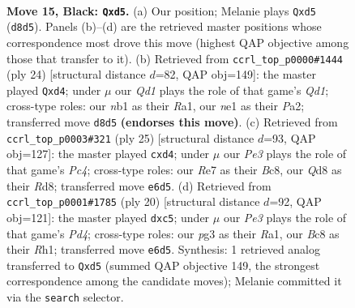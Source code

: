\documentclass[11pt]{article}
\begin{document}
\clearpage

\begin{figure}[p]\centering
\begin{subfigure}{0.46\textwidth}\centering
\resizebox{\linewidth}{!}{%
\newchessgame
\chessboard[
  setfen={r1bq2k1/p3rppp/4pn2/2pP4/n7/3BP1P1/PP3RPP/RNQ1N1K1 b - - 0 15},
  showmover=false,
  pgfstyle=straightmove, color=movearrow, markmove={d8-d5}
]}
\caption{}
\end{subfigure}\hfill
\begin{subfigure}{0.46\textwidth}\centering
\resizebox{\linewidth}{!}{%
\newchessgame
\chessboard[
  setfen={rn2k2r/4bppp/pq2p3/1p1b4/3p4/1P2PNP1/P4PBP/R1BQR1K1 w kq - 0 13},
  showmover=false,
  pgfstyle=straightmove, color=movearrow, markmove={d1-d4}
]}
\caption{}
\end{subfigure}
\\[4pt]
\begin{subfigure}{0.46\textwidth}\centering
\resizebox{\linewidth}{!}{%
\newchessgame
\chessboard[
  setfen={r1br2k1/pp3ppp/2n1p2q/2p5/3PQ3/3B1N2/PPP2PPP/1K1R3R b - - 7 13},
  showmover=false,
  pgfstyle=straightmove, color=movearrow, markmove={c5-d4}
]}
\caption{}
\end{subfigure}\hfill
\begin{subfigure}{0.46\textwidth}\centering
\resizebox{\linewidth}{!}{%
\newchessgame
\chessboard[
  setfen={r1b2rk1/pp1nqppp/8/2pp4/3P4/4PN2/PPQ2PPP/R3KB1R w KQ - 0 11},
  showmover=false,
  pgfstyle=straightmove, color=movearrow, markmove={d4-c5}
]}
\caption{}
\end{subfigure}
\caption{\textbf{Move 15, Black: \texttt{Qxd5}.} (a) Our position; Melanie plays \texttt{Qxd5} (\texttt{d8d5}). Panels (b)--(d) are the retrieved master positions whose correspondence most drove this move (highest QAP objective among those that transfer to it). (b) Retrieved from \texttt{ccrl\_top\_p0000\#1444} (ply 24) [structural distance $d$=82, QAP obj=149]: the master played \texttt{Qxd4}; under $\mu$ our \emph{Qd1} plays the role of that game's \emph{Qd1}; cross-type roles: our \emph{n}b1 as their \emph{R}a1, our \emph{n}e1 as their \emph{P}a2; transferred move \texttt{d8d5} \textbf{(endorses this move)}. (c) Retrieved from \texttt{ccrl\_top\_p0003\#321} (ply 25) [structural distance $d$=93, QAP obj=127]: the master played \texttt{cxd4}; under $\mu$ our \emph{Pe3} plays the role of that game's \emph{Pc4}; cross-type roles: our \emph{R}e7 as their \emph{B}c8, our \emph{Q}d8 as their \emph{R}d8; transferred move \texttt{e6d5}. (d) Retrieved from \texttt{ccrl\_top\_p0001\#1785} (ply 20) [structural distance $d$=92, QAP obj=121]: the master played \texttt{dxc5}; under $\mu$ our \emph{Pe3} plays the role of that game's \emph{Pd4}; cross-type roles: our \emph{p}g3 as their \emph{R}a1, our \emph{B}c8 as their \emph{R}h1; transferred move \texttt{e6d5}. Synthesis: 1 retrieved analog transferred to \texttt{Qxd5} (summed QAP objective 149, the strongest correspondence among the candidate moves); Melanie committed it via the \texttt{search} selector.}
\label{fig:thought-m29}
\end{figure}
\end{document}
